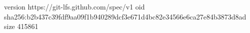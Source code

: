 version https://git-lfs.github.com/spec/v1
oid sha256:b2b437c39fdf9aa09f1b940289dcf3e671d4bc82e34566e6ca27e84b3873d8ad
size 415861
